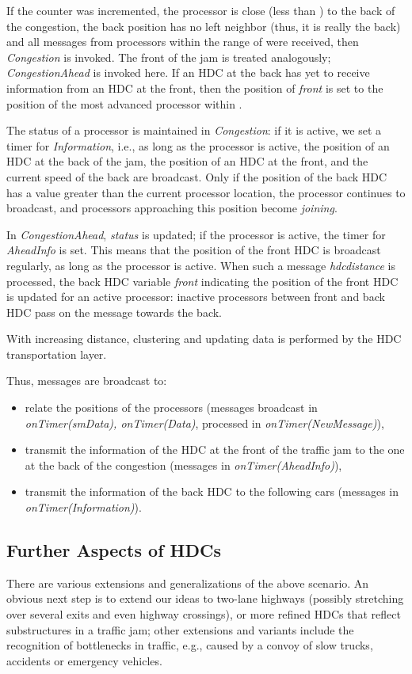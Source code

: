\documentclass{acmrip}
\begin{document}
If the counter was incremented, the processor is close (less than
) to the back of the congestion, the back position
has no left neighbor (thus,
it is really the back) and all messages from processors within the
range of  were received, then {\em Congestion} is invoked. The
front of the jam is treated analogously; {\em CongestionAhead} is
invoked here. If an HDC at the back has yet to receive information
from an HDC at the front, then the position of {\em front} is set
to the position of the most advanced processor within .

The status of a processor is maintained in {\em Congestion}: if it
is active, we set a timer for {\em Information}, i.e., as long as
the processor is active, the position of an HDC at the back of the
jam, the position of an HDC at the front, and the current speed of
the back are broadcast. Only if the position of the back HDC has a
value greater than the current processor location, the processor
continues to broadcast, and processors approaching this position
become {\em joining}.

In {\em CongestionAhead}, {\em status} is updated;
if the processor is active, the timer for {\em AheadInfo} is set.
This means that the position of the front HDC is broadcast
regularly, as long as the processor is active. When such a message
{\em hdcdistance} is processed, the back HDC variable {\em front}
indicating the position of the front HDC is updated for an active
processor: inactive processors between front and back HDC pass on
the message towards the back.


With increasing distance, clustering and updating data is performed
by the HDC transportation layer.

Thus, messages are broadcast to:
\begin{itemize}
\item relate the positions of the processors (messages broadcast in
{\em onTimer(smData), onTimer(Data)}, processed in {\em onTimer(NewMessage)}),
\item transmit the information of the HDC at the front of the
traffic jam to the one at the back of the congestion (messages in
{\em onTimer(AheadInfo)}),
\item transmit the information of the back HDC to the following cars
(messages in {\em onTimer(Information)}).
\end{itemize}

\subsection{Further Aspects of HDCs}
There are various extensions and generalizations of the above
scenario. An obvious next step is to extend our ideas to two-lane
highways (possibly stretching over several exits and even highway
crossings), or more refined HDCs that reflect substructures in a
traffic jam; other extensions and variants include the recognition
of bottlenecks in traffic, e.g., caused by a convoy of slow trucks,
accidents or emergency vehicles.
\end{document}
